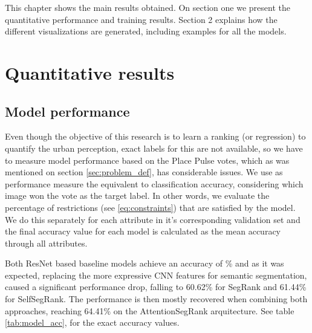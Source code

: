 This chapter shows the main results obtained. On section one we present the quantitative
performance and training results. Section 2 explains how the different visualizations
are generated, including examples for all the models.

\section{Quantitative results}

\subsection{Model performance}

Even though the objective of this research is to learn a ranking (or regression) to
quantify the urban perception, exact labels for this are not available, so we have to measure
model performance based on the Place Pulse votes, which as was mentioned on section
\ref{sec:problem_def}, has considerable issues. We use as performance measure the
equivalent to classification accuracy, considering which image won the vote as the target label.
In other words, we evaluate the percentage of restrictions (see \ref{eq:constraints})
that are satisfied by the model. We do this separately for each attribute in it's corresponding
validation set and the final accuracy value for each model is calculated as the mean accuracy through
all attributes.

Both ResNet based baseline models achieve an accuracy of \% and
as it was expected, replacing the more expressive CNN features for semantic segmentation,
caused a significant performance drop, falling to 60.62\% for SegRank and 61.44\%
for SelfSegRank. The performance is then mostly recovered when combining both approaches,
reaching 64.41\% on the AttentionSegRank arquitecture. See table \ref{tab:model_acc}, for the exact accuracy values.


